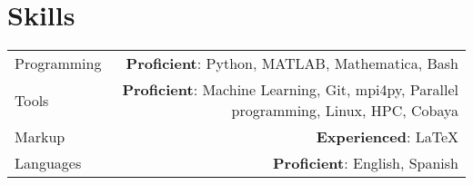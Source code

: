 \documentclass{article}
\begin{document}
\section*{Skills}

\begin{tabular}{L!{\vrule}R}
	Programming & \textbf{Proficient}: Python, MATLAB, Mathematica, Bash \\
  Tools & \textbf{Proficient}: Machine Learning, Git, mpi4py, Parallel programming, Linux, HPC, Cobaya\\
	Markup & \textbf{Experienced}: LaTeX\\
	Languages & \textbf{Proficient}: English, Spanish\\
\end{tabular}
\end{document}
